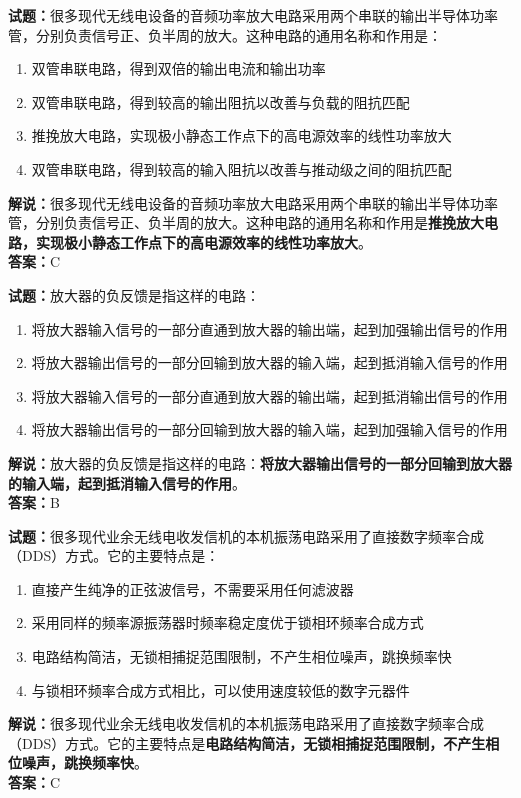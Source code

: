 \documentclass{ctexbook}
\begin{document}
\bigskip


\noindent\textbf{试题：}很多现代无线电设备的音频功率放大电路采用两个串联的输出半导体功率管，分别负责信号正、负半周的放大。这种电路的通用名称和作用是：
\begin{enumerate}[leftmargin=3em]
\item 双管串联电路，得到双倍的输出电流和输出功率
\item 双管串联电路，得到较高的输出阻抗以改善与负载的阻抗匹配
\item 推挽放大电路，实现极小静态工作点下的高电源效率的线性功率放大
\item 双管串联电路，得到较高的输入阻抗以改善与推动级之间的阻抗匹配
\end{enumerate}
\noindent\textbf{解说：}很多现代无线电设备的音频功率放大电路采用两个串联的输出半导体功率管，分别负责信号正、负半周的放大。这种电路的通用名称和作用是\textbf{推挽放大电路，实现极小静态工作点下的高电源效率的线性功率放大}。\\\noindent\textbf{答案：}C






\bigskip


\noindent\textbf{试题：}放大器的负反馈是指这样的电路：
\begin{enumerate}[leftmargin=3em]
\item 将放大器输入信号的一部分直通到放大器的输出端，起到加强输出信号的作用
\item 将放大器输出信号的一部分回输到放大器的输入端，起到抵消输入信号的作用
\item 将放大器输入信号的一部分直通到放大器的输出端，起到抵消输出信号的作用
\item 将放大器输出信号的一部分回输到放大器的输入端，起到加强输入信号的作用

\end{enumerate}
\noindent\textbf{解说：}放大器的负反馈是指这样的电路：\textbf{将放大器输出信号的一部分回输到放大器的输入端，起到抵消输入信号的作用}。\\\noindent\textbf{答案：}B


\bigskip


\noindent\textbf{试题：}很多现代业余无线电收发信机的本机振荡电路采用了直接数字频率合成（DDS）方式。它的主要特点是：
\begin{enumerate}[leftmargin=3em]
\item 直接产生纯净的正弦波信号，不需要采用任何滤波器
\item 采用同样的频率源振荡器时频率稳定度优于锁相环频率合成方式
\item 电路结构简洁，无锁相捕捉范围限制，不产生相位噪声，跳换频率快
\item 与锁相环频率合成方式相比，可以使用速度较低的数字元器件
\end{enumerate}
\noindent\textbf{解说：}很多现代业余无线电收发信机的本机振荡电路采用了直接数字频率合成（DDS）方式。它的主要特点是\textbf{电路结构简洁，无锁相捕捉范围限制，不产生相位噪声，跳换频率快}。\\\noindent\textbf{答案：}C
\end{document}
